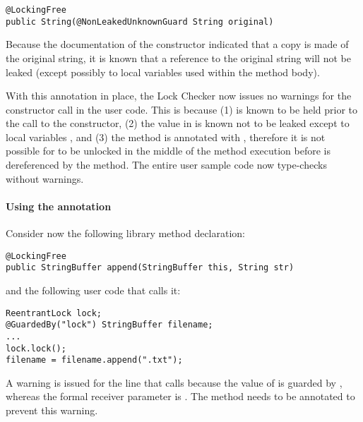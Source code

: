 \begin{verbatim}
@LockingFree
public String(@NonLeakedUnknownGuard String original)
\end{verbatim}

Because the documentation of the constructor indicated that a copy
is made of the original string, it is known that a reference to the
original string will not be leaked (except possibly to local variables
used within the method body).

With this  annotation in place, the
Lock Checker now issues no warnings for the 
constructor call in the user code.  This is because (1) 
is known to be held prior to the call to the constructor, (2) the
value in  is known not to be leaked except to local
variables , and (3) the method is annotated with ,
therefore it is not possible for  to be unlocked in the
middle of the method execution before  is dereferenced
by the method.  The entire user sample code now type-checks without
warnings.

\paragraph{Using the  annotation\label{lock-checker-library-methods-leakedtoresultunknownguard}}

Consider now the following library method declaration:

\begin{verbatim}
@LockingFree
public StringBuffer append(StringBuffer this, String str)
\end{verbatim}

and the following user code that calls it:

\begin{verbatim}
ReentrantLock lock;
@GuardedBy("lock") StringBuffer filename;
...
lock.lock();
filename = filename.append(".txt");
\end{verbatim}

A warning is issued
for the line that calls  because the value of
 is guarded by , whereas the formal receiver parameter
 is .  The 
method needs to be annotated to prevent this warning.


